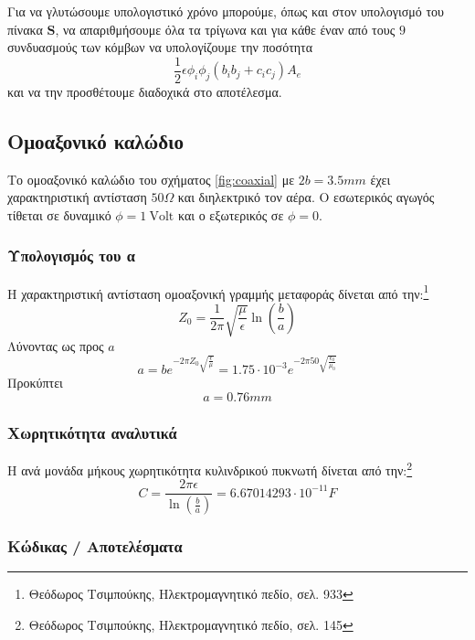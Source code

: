 \documentclass[10pt, letterpaper]{article}
\newcommand{\en}{\selectlanguage{english}}
\newcommand{\gr}{\selectlanguage{greek}}
\begin{document}
Για να γλυτώσουμε υπολογιστικό χρόνο μπορούμε, όπως και στον υπολογισμό του πίνακα $\mathbf{S}$, να απαριθμήσουμε όλα τα 
τρίγωνα και για κάθε έναν από τους $9$ συνδυασμούς των κόμβων να υπολογίζουμε την ποσότητα 
\[ \frac{1}{2} \epsilon  \phi_i \phi_j  (b_ib_j + c_ic_j) A_e   \]
και να την προσθέτουμε διαδοχικά στο αποτέλεσμα. 












\subsection*{Ομοαξονικό καλώδιο}

Το ομοαξονικό καλώδιο του σχήματος \ref{fig:coaxial} με $2b = 3.5 mm $ έχει χαρακτηριστική αντίσταση $50 \Omega$ και διηλεκτρικό 
τον αέρα. Ο εσωτερικός αγωγός τίθεται σε δυναμικό \en $\phi = 1 \ \text{Volt}$ \gr και ο εξωτερικός σε $\phi = 0$.

\subsubsection*{Υπολογισμός του α}


Η χαρακτηριστική αντίσταση ομοαξονική γραμμής μεταφοράς δίνεται από την:\footnote{Θεόδωρος Τσιμπούκης, Ηλεκτρομαγνητικό πεδίο, σελ. 933}
\[ Z_0 = \frac{1}{2 \pi}\sqrt{\frac{\mu}{\epsilon}} \ln (\frac{b}{a})  \]
Λύνοντας ως προς $a$
\[ a = b e^{-2\pi Z_0 \sqrt{\frac{\epsilon}{\mu}}}  = 1.75 \cdot 10^{-3} e^{-2\pi 50 \sqrt{\frac{\epsilon_0}{\mu_0}}}\]
Προκύπτει
\[a = 0.76 mm\]



\subsubsection*{Χωρητικότητα αναλυτικά }

Η ανά μονάδα μήκους χωρητικότητα κυλινδρικού πυκνωτή δίνεται από την:\footnote{Θεόδωρος Τσιμπούκης, Ηλεκτρομαγνητικό πεδίο, σελ. 145}
\begin{equation} \label{eq:analytical_capacitance_coaxial}
  C = \frac{2 \pi \epsilon}{\ln (\frac{b}{a})} =  6.67014293 \cdot 10^{-11} F
\end{equation}


\subsubsection*{Κώδικας / Αποτελέσματα}
\end{document}

